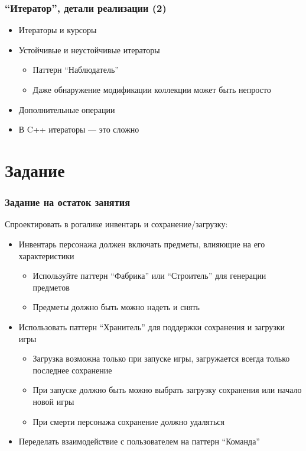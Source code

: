\documentclass[xetex,mathserif,serif]{beamer}
\begin{document}
    \begin{frame}
        \frametitle{``Итератор'', детали реализации (2)}
        \begin{itemize}
            \item Итераторы и курсоры
            \item Устойчивые и неустойчивые итераторы
            \begin{itemize}
                \item Паттерн ``Наблюдатель''
                \item Даже обнаружение модификации коллекции может быть непросто
            \end{itemize}
            \item Дополнительные операции
            \item В C++ итераторы --- это сложно
        \end{itemize}
    \end{frame}

    \section{Задание}

    \begin{frame}
        \frametitle{Задание на остаток занятия}
        Спроектировать в рогалике инвентарь и сохранение/загрузку:
        \begin{itemize}
            \item Инвентарь персонажа должен включать предметы, влияющие на его характеристики
            \begin{itemize}
                \item Используйте паттерн ``Фабрика'' или ``Строитель'' для генерации предметов
                \item Предметы должно быть можно надеть и снять
            \end{itemize}
            \item Использовать паттерн ``Хранитель'' для поддержки сохранения и загрузки игры
            \begin{itemize}
                \item Загрузка возможна только при запуске игры, загружается всегда только последнее сохранение
                \item При запуске должно быть можно выбрать загрузку сохранения или начало новой игры
                \item При смерти персонажа сохранение должно удаляться
            \end{itemize}
            \item Переделать взаимодействие с пользователем на паттерн ``Команда''
        \end{itemize}
    \end{frame}
\end{document}
